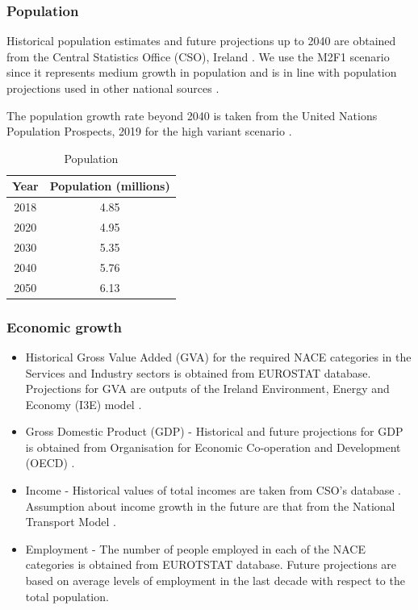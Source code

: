 \documentclass[journal abbreviation, manuscript]{copernicus}
\begin{document}
\subsubsection{Population}
Historical population estimates and future projections up to 2040 are obtained from the Central Statistics Office (CSO), Ireland \citep{CentralStatisticsOffice2020}. We use the M2F1 scenario since it represents medium growth in population and is in line with population projections used in other national sources \citep{Yakut2020}. 

The population growth rate beyond 2040 is taken from the United Nations Population Prospects, 2019 for the high variant scenario \citep{UnitedNations2019}.
\begin{table}[htbp]
 \centering
 \footnotesize
 \caption{Population}
 \begin{tabular}{cc}
 \hline
 Year & Population (millions) \\
 \hline
 2018 & 4.85 \\
 2020 & 4.95 \\
 2030 & 5.35 \\
 2040 & 5.76 \\
 2050 & 6.13 \\
 \hline
 \end{tabular}%
 \label{tab:pop}%
\end{table}%


\subsubsection{Economic growth}
\begin{itemize}
 \item Historical Gross Value Added (GVA) for the required NACE categories in the Services and Industry sectors is obtained from EUROSTAT database. Projections for GVA are outputs of the Ireland Environment, Energy and Economy (I3E) model \citep{Yakut2020}.
 \item Gross Domestic Product (GDP) - Historical and future projections for GDP is obtained from Organisation for Economic Co-operation and Development (OECD) \citep{OECD2018}. 
 \item Income - Historical values of total incomes are taken from CSO's database \citep{CSOincome}. Assumption about income growth in the future are that from the National Transport Model \citep{AECOMIrelandLimited2019}. 
 \item Employment - The number of people employed in each of the NACE categories is obtained from EUROTSTAT database. Future projections are based on average levels of employment in the last decade with respect to the total population. 
\end{itemize}
\end{document}
